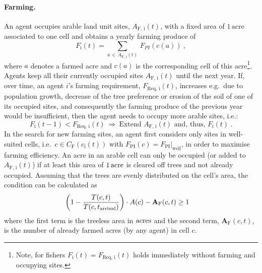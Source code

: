 \paragraph{Farming.}
An agent occupies arable land unit sites, $A_\text{F, i}(t)$, with a fixed area of $1\, \text{acre}$ associated to one cell and obtains a yearly farming produce of
\begin{equation}\label{AProd}
F_\text{i}(t) = \sum_{a \, \in \, A_\text{F, i}(t)} \, F_{PI}(c(a))\ ,
\end{equation}
where $a$ denotes a farmed acre and $c(a)$ is the corresponding cell of this acre\footnote{Note, for fishers $F_\text{i}(t) = F_\text{Req, i}(t)$ holds immediately without farming and occupying sites.}.
Agents keep all their currently occupied sites $A_\text{F, i}(t)$ until the next year. %
If, over time, an agent $i$'s farming requirement, $F_\text{Req, i}(t)$, increases e.g.\ due to population growth, decrease of the tree preference or erosion of the soil of one of its occupied sites, and consequently the farming produce of the previous year would be insufficient, then the agent needs to occupy more arable sites, i.e.: 
\begin{equation}
F_\text{i}(t-1) < F_\text{Req, i}(t) \ \Rightarrow \ \text{Extend } A_\text{F, i}(t) \text{ and, thus, } F_\text{i}(t) \ .
\end{equation}
In the search for new farming sites, an agent first considers only sites in well-suited cells, i.e.\ $c \in C_\text{F}(c_\text{i}(t))$ with $F_\text{PI}(c)=F_\text{PI}|_\text{well}$, in order to maximise farming efficiency.
An acre in an arable cell can only be occupied (or added to $A_\text{F, i}(t)$) if at least this area of $1\, {\rm acre}$ is cleared off trees and not already occupied. 
Assuming that the trees are evenly distributed on the cell's area, the condition can be calculated as 
\begin{eqnarray}
\left( 1 - \frac{T(c,t)}{T(c,t_{\rm arrival})} \right) \cdot A(c) - \mathbf{A}_\text{F}(c, t) & \geq   1
\label{eq:BurningCond}
\end{eqnarray}
where the first term is the treeless area in ${\rm acres}$ and the second term, $\mathbf{A}_\text{F}(c, t)$, is the number of already farmed acres (by any agent) in cell $c$.%

